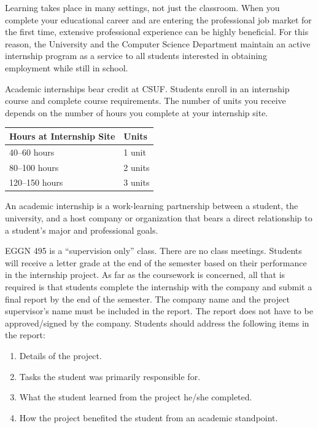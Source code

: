 \documentclass{book}
\newcommand{\CampusName}{CSUF}
\begin{document}
Learning takes place in many settings, not just the classroom. When you complete your educational career and are entering the professional job market for the first time, extensive professional experience can be highly beneficial. For this reason, the University and the Computer Science Department maintain an active internship program as a service to all students interested in obtaining employment while still in school.

Academic internships bear credit at \CampusName. Students enroll in an internship course and complete course requirements. The number of units you receive depends on the number of hours you complete at your internship site.

\begin{center}
\begin{tabular}{|l|l|} \hline
  \textbf{Hours at Internship Site} & \textbf{Units} \\ \hline
  40--60 hours & 1 unit \\ \hline
  80--100 hours & 2 units \\ \hline
  120--150 hours & 3 units \\ \hline
\end{tabular}
\end{center}

An academic internship is a work-learning partnership between a student, the university, and a host company or organization that bears a direct relationship to a student’s major and professional goals.

EGGN 495 is a ``supervision only'' class. There are no class meetings. Students will receive a letter grade at the end of the semester based on their performance in the internship project. As far as the coursework is concerned, all that is required is that students complete the internship with the company and submit a final report by the end of the semester. The company name and the project supervisor's name must be included in the report. The report does not have to be approved/signed by the company. Students should address the following items in the report:
\begin{enumerate}
\item Details of the project.
\item Tasks the student was primarily responsible for.
\item What the student learned from the project he/she completed.
\item How the project benefited the student from an academic standpoint.
\end{enumerate}
\end{document}
